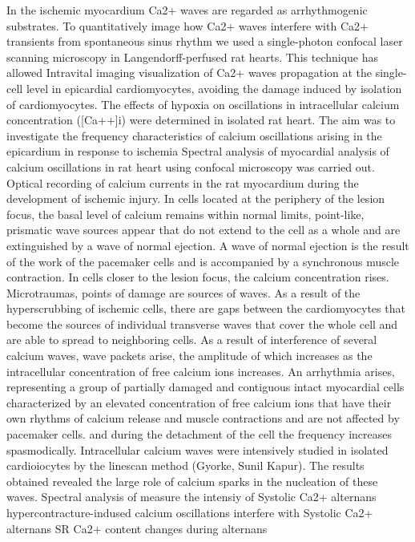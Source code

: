 \documentclass[a4paper,12pt]{article}
\begin{document}
In the ischemic myocardium Ca2+ waves are regarded as arrhythmogenic substrates.
To quantitatively image how Ca2+ waves interfere with Ca2+ transients from spontaneous sinus rhythm we used a single-photon confocal laser scanning microscopy in Langendorff-perfused rat hearts.
This technique has allowed Intravital imaging visualization of Ca2+ waves propagation at the single-cell level in epicardial cardiomyocytes, avoiding the damage induced by isolation of cardiomyocytes.
The effects of hypoxia on oscillations in intracellular calcium concentration ([Ca++]i) were determined in isolated rat heart.
The aim was to investigate the frequency characteristics of calcium oscillations arising in the epicardium in response to ischemia
Spectral  analysis of myocardial analysis of calcium oscillations in rat heart using confocal microscopy was carried out.
Optical recording of calcium currents in the rat myocardium during the development of ischemic injury.
In cells located at the periphery of the lesion focus, the basal level of calcium remains within normal limits, point-like, prismatic wave sources appear that do not extend to the cell as a whole and are extinguished by a wave of normal ejection.
A wave of normal ejection is the result of the work of the pacemaker cells and is accompanied by a synchronous muscle contraction.
In cells closer to the lesion focus, the calcium concentration rises.
Microtraumas, points of damage are sources of waves.
As a result of the hyperscrubbing of ischemic cells, there are gaps between the cardiomyocytes that become the sources of individual transverse waves that cover the whole cell and are able to spread to neighboring cells.
As a result of interference of several calcium waves, wave packets arise, the amplitude of which increases as the intracellular concentration of free calcium ions increases.
An arrhythmia arises, representing a group of partially damaged and contiguous intact myocardial cells characterized by an elevated concentration of free calcium ions that have their own rhythms of calcium release and muscle contractions and are not affected by pacemaker cells.
and during the detachment of the cell the frequency increases spasmodically.
Intracellular calcium waves were intensively studied in isolated cardioiocytes by the linescan method (Gyorke, Sunil Kapur).
The results obtained revealed the large role of calcium sparks in the nucleation of these waves.
Spectral analysis of
 measure the intensiy of Systolic Ca2+ alternans
hypercontracture-indused calcium oscillations interfere with Systolic Ca2+ alternans
SR Ca2+ content changes during alternans \cite{diaz2004sarcoplasmic}
\end{document}
